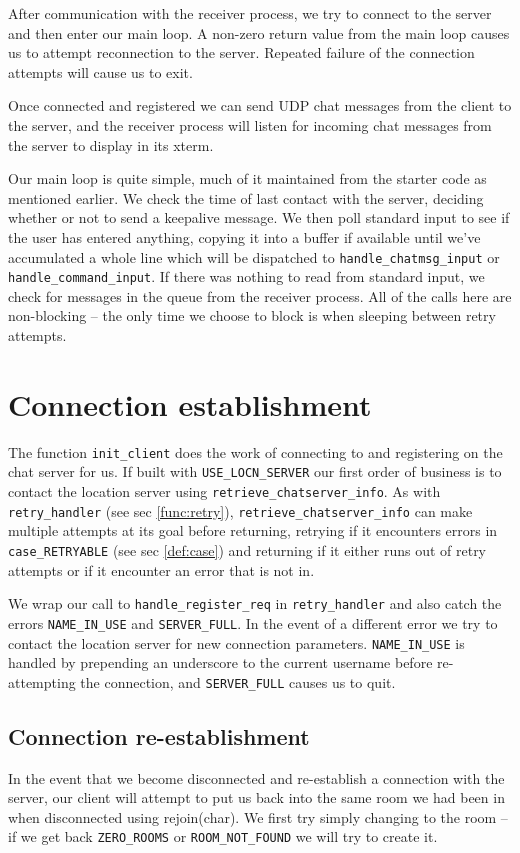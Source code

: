 \documentclass[12pt]{article}
\newcommand{\mono}[1]{\texttt{#1}}
\begin{document}
After communication with the receiver process, we try to connect to the
server and then enter our main loop. A non-zero return value from the
main loop causes us to attempt reconnection to the server. Repeated 
failure of the connection attempts will cause us to exit.

Once connected and registered we can send UDP chat messages from the
client to the server, and the receiver process will listen for incoming
chat messages from the server to display in its xterm.

Our main loop is quite simple, much of it maintained from the starter code
as mentioned earlier. We check the time of last contact with the server,
deciding whether or not to send a keepalive message. We then
poll standard input to see if the user has entered anything, copying it into
a buffer if available until we've accumulated a whole line which will be
dispatched to \mono{handle\_chatmsg\_input} or
\mono{handle\_command\_input}. If there 
was nothing to read from standard input, we check for messages in the
queue from the receiver process. All of the calls here are non-blocking --
the only time we choose to block is when sleeping between retry attempts.

\section{Connection establishment}
\label{sec:init}
The function \mono{init\_client} does the work of connecting to and registering
on the chat server for us.
If built with \mono{USE\_LOCN\_SERVER} our first order of business is to contact
the location server using \mono{retrieve\_chatserver\_info}. As with 
\mono{retry\_handler} (see sec \ref{func:retry}), \mono{retrieve\_chatserver\_info} can
make multiple attempts
at its goal before returning, retrying if it encounters errors in
\mono{case\_RETRYABLE} (see sec \ref{def:case}) and returning if it either runs
out of retry attempts or if it encounter an error that is not in.

We wrap our call to \mono{handle\_register\_req} in \mono{retry\_handler} and
also catch the errors \mono{NAME\_IN\_USE} and \mono{SERVER\_FULL}. In the event
of a different
error we try to contact the location server for new connection parameters.
\mono{NAME\_IN\_USE} is handled by prepending an underscore to the current username
before re-attempting the connection, and \mono{SERVER\_FULL} causes us to quit.

\subsection{Connection re-establishment}
In the event that we become disconnected and re-establish a connection with
the server, our client will attempt to put us back into the same room we had
been in when disconnected using rejoin(char). We first try simply changing to
the room -- if we get back \mono{ZERO\_ROOMS} or \mono{ROOM\_NOT\_FOUND} we will try to
create it.
\end{document}
